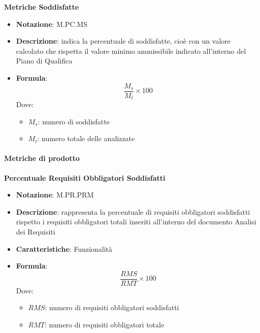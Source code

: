 \textbf{Metriche Soddisfatte}
\begin{itemize}
    \item \textbf{Notazione}: M.PC.MS
    \item \textbf{Descrizione}: indica la percentuale di  soddisfatte, cioè con un valore calcolato che rispetta il valore minimo ammissibile indicato all'interno del Piano di Qualifica
    \item \textbf{Formula}:
    \begin{equation}
        \frac{M_s}{M_t} \times 100
    \end{equation}
    Dove:
    \begin{itemize}
        \item $M_s$: numero di  soddisfatte
        \item $M_t$: numero totale delle  analizzate
    \end{itemize}
\end{itemize}

\paragraph{Metriche di prodotto}
\textbf{Percentuale Requisiti Obbligatori Soddisfatti}
\begin{itemize}
    \item \textbf{Notazione}: M.PR.PRM
    \item \textbf{Descrizione}: rappresenta la percentuale di requisiti obbligatori soddisfatti rispetto i requisiti obbligatori totali inseriti all'interno del documento Analisi dei Requisiti
    \item \textbf{Caratteristiche}: Funzionalità
    \item \textbf{Formula}: 
    \begin{equation}
        \frac{RMS}{RMT} \times 100
    \end{equation}
    Dove:
    \begin{itemize}
        \item $RMS$: numero di requisiti obbligatori soddisfatti
        \item $RMT$: numero di requisiti obbligatori totale
    \end{itemize} 
\end{itemize}

